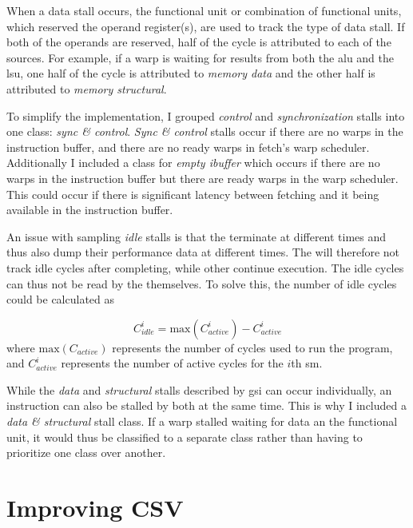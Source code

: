 When a data stall occurs, the functional unit or combination of functional units, which reserved the operand register(s), are used to track the type of data stall. If both of the operands are reserved, half of the cycle is attributed to each of the sources. For example, if a warp is waiting for results from both the \acrshort{alu} and the \acrshort{lsu}, one half of the cycle is attributed to \textit{memory data} and the other half is attributed to \textit{memory structural}. 

To simplify the implementation, I grouped \textit{control} and \textit{synchronization} stalls into one class: \textit{sync \& control}. \textit{Sync \& control} stalls occur if there are no warps in the instruction buffer, and there are no ready warps in fetch's warp scheduler. Additionally I included a class for \textit{empty ibuffer} which occurs if there are no warps in the instruction buffer but there are ready warps in the warp scheduler. This could occur if there is significant latency between fetching and it being available in the instruction buffer.

An issue with sampling \textit{idle} stalls is that the  terminate at different times and thus also dump their performance data at different times. The  will therefore not track idle cycles after completing, while other  continue execution. The idle cycles can thus not be read by the  themselves. To solve this, the number of idle cycles could be calculated as

\begin{equation} \label{eq:idle}
    C^i_{idle} = \textrm{max}(C^i_{active}) - C^i_{active}
\end{equation}
\noindent
where $\textrm{max}(C_{active})$ represents the number of cycles used to run the program, and $C^i_{active}$ represents the number of active cycles for the $i$th \acrshort{sm}.

While the \textit{data} and \textit{structural} stalls described by \acrshort{gsi} can occur individually, an instruction can also be stalled by both at the same time. This is why I included a \textit{data \& structural} stall class. If a warp stalled waiting for data an the functional unit, it would thus be classified to a separate class rather than having to prioritize one class over another.

\section{Improving CSV} \label{sec:improve_csv}

